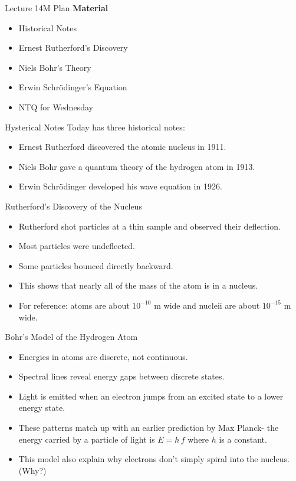 \documentclass[english]{beamer}
\begin{document}
\begin{frame}{Lecture 14M Plan}
  \textbf{Material}
  \begin{itemize}
    \item Historical Notes
    \item Ernest Rutherford's Discovery
    \item Niels Bohr's Theory
    \item Erwin Schr{\"o}dinger's Equation
    \item NTQ for Wednesday
  \end{itemize}
\end{frame}

\begin{frame}{Hysterical Notes}
  Today has three historical notes:
  \begin{itemize}
    \item Ernest Rutherford discovered the atomic nucleus in 1911.
    \item Niels Bohr gave a quantum theory of the hydrogen atom in 1913.
    \item Erwin Schr{\"o}dinger developed his wave equation in 1926.
  \end{itemize}
\end{frame}

\begin{frame}{Rutherford's Discovery of the Nucleus}
  \begin{itemize}
    \item Rutherford shot particles at a thin sample and observed their deflection.
    \item Most particles were undeflected.
    \item Some particles bounced directly backward.
    \item This shows that nearly all of the mass of the atom is in a nucleus.
    \item For reference: atoms are about $10^{-10}$ m wide and nucleii are about $10^{-15}$ m wide.
  \end{itemize}
\end{frame}

\begin{frame}{Bohr's Model of the Hydrogen Atom}
  \begin{itemize}
    \item Energies in atoms are discrete, not continuous.
    \item Spectral lines reveal energy gaps between discrete states.
    \item Light is emitted when an electron jumps from an excited state to a lower energy state.
    \item These patterns match up with an earlier prediction by Max Planck- the energy carried by a particle of light is $E=h\,f$ where $h$ is a constant.
    \item This model also explain why electrons don't simply spiral into the nucleus. (Why?)
  \end{itemize}
\end{frame}
\end{document}
